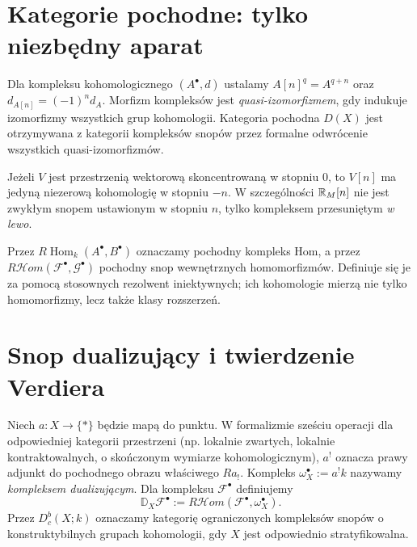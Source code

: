 \section{Kategorie pochodne: tylko niezbędny aparat}
\begin{definicja}
Dla kompleksu kohomologicznego $(A^\bullet,d)$ ustalamy
$A[n]^q=A^{q+n}$ oraz $d_{A[n]}=(-1)^n d_A$.
Morfizm kompleksów jest \emph{quasi-izomorfizmem}, gdy
indukuje izomorfizmy wszystkich grup kohomologii.
Kategoria pochodna $D(X)$ jest otrzymywana z kategorii
kompleksów snopów przez formalne odwrócenie wszystkich
quasi-izomorfizmów.
\end{definicja}

\begin{przyklad}
Jeżeli $V$ jest przestrzenią wektorową skoncentrowaną
w stopniu $0$, to $V[n]$ ma jedyną niezerową kohomologię
w stopniu $-n$. W szczególności $\mathbb{R}_M[n]$ nie jest
zwykłym snopem ustawionym w stopniu $n$, tylko
kompleksem przesuniętym \emph{w lewo}.
\end{przyklad}

\begin{definicja}
Przez $R\!\operatorname{Hom}_k(A^\bullet,B^\bullet)$
oznaczamy pochodny kompleks Hom, a przez
$R\mathcal Hom(\mathcal F^\bullet,\mathcal G^\bullet)$
pochodny snop wewnętrznych homomorfizmów.
Definiuje się je za pomocą stosownych rezolwent
iniektywnych; ich kohomologie mierzą nie tylko
homomorfizmy, lecz także klasy rozszerzeń.
\end{definicja}

\section{Snop dualizujący i twierdzenie Verdiera}
\begin{definicja}
\label{def:verdier-v12}
Niech $a:X\to\{*\}$ będzie mapą do punktu.
W formalizmie sześciu operacji dla odpowiedniej kategorii
przestrzeni (np. lokalnie zwartych, lokalnie kontraktowalnych,
o skończonym wymiarze kohomologicznym), $a^!$ oznacza
prawy adjunkt do pochodnego obrazu właściwego $Ra_!$.
Kompleks
$\omega_X^\bullet:=a^!k$ nazywamy \emph{kompleksem dualizującym}.
Dla kompleksu $\mathcal F^\bullet$ definiujemy
\[
\mathbb D_X\mathcal F^\bullet
:=R\mathcal Hom(\mathcal F^\bullet,\omega_X^\bullet).
\]
Przez $D^b_c(X;k)$ oznaczamy kategorię ograniczonych
kompleksów snopów o konstruktybilnych grupach kohomologii,
gdy $X$ jest odpowiednio stratyfikowalna.
\end{definicja}

